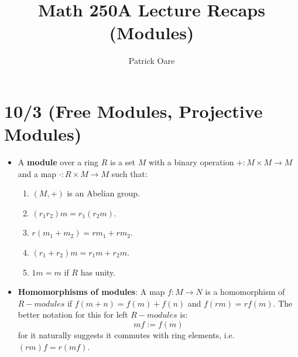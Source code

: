 \documentclass[11pt, oneside]{amsart}   	%
\title{Math 250A Lecture Recaps (Modules)}
\author{Patrick Oare}
\theoremstyle{definition}
\begin{document}
\maketitle

\section{10/3 (Free Modules, Projective Modules)}

\begin{itemize}

	\item A \textbf{module} over a ring $R$ is a set $M$ with a binary operation $+ : M\times M\rightarrow M$ and a map $\cdot: R\times M\rightarrow 
	M$ such that:
		
		\begin{enumerate}
		
			\item $(M, +)$ is an Abelian group.
			
			\item $(r_1r_2)m = r_1(r_2 m)$.
			
			\item $r(m_1 + m_2) = rm_1 + rm_2$.
			
			\item$ (r_1 + r_2)m = r_1m + r_2m$.
			
			\item $1m = m$ if $R$ has unity.
		
		\end{enumerate}
	
	\item \textbf{Homomorphisms of modules}: A map $f : M\rightarrow N$ is a homomorphism of $R-modules$ if $f(m + n) = f(m) + f(n)$ and $f(rm) = 
	rf(m)$. The better notation for this for left $R-modules$ is:
	$$
		mf := f(m)
	$$
	for it naturally suggests it commutes with ring elements, i.e. $(rm)f = r(mf)$. 
	

\end{itemize}
\end{document}

